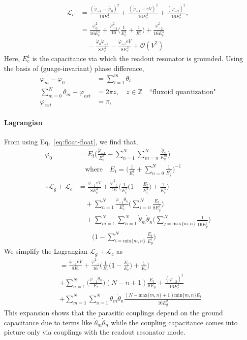 \documentclass[%
reprint,
superscriptaddress,
 amsmath,amssymb,
 aps,
 prx,
longbibliography,
floatfix,
]{revtex4-2}
\begin{document}
\begin{align}
\mathcal{L}_{c}&=\frac{(\dot{\varphi}_{-1}-\dot{\varphi_0})^2}{16E^1_{c}}+\frac{(\dot{\varphi}_{-1}-eV)^2}{16E^3_{c}}+\frac{(\dot{\varphi}_{-2})^2}{16E^4_{c}},\\ &=\frac{\dot{\varphi}^2_0}{16E^1_c}+\frac{\dot{\varphi}^2_{-1}}{16}\Big(\frac{1}{E^1_c}+\frac{1}{E^3_c}\Big)+\frac{\dot{\varphi}^2_{-2}}{16E^4_c}\nonumber\\&\quad-\frac{\dot{\varphi}_0\dot{\varphi}_{-1}}{8E^1_c}-\frac{\dot{\varphi}_{-1}eV}{8E^3_c}+\mathcal{O}(V^2)
\end{align}
Here, $E_c^4$ is the capacitance via which the readout resonator is grounded. Using the basis of (guage-invariant) phase difference, 
\begin{align}
\varphi_m-\varphi_0&=\sum_{l=1}^m\theta_l\\ \sum_{m=0}^N \theta_m+\varphi_{ext}&=2\pi z, \quad z\in\mathbb{Z}\quad\text{``fluxoid quantization"}\\
\varphi_{ext}&=\pi,    
\end{align}
\paragraph{Lagrangian} 
From using Eq.~\ref{eq:float-float}, we find that, 
\begin{align}
    \dot{\varphi}_0&=E_t\Big(\frac{\dot{\varphi}_{-1}}{E_c^1}-\sum_{n=1}^N\sum_{m=n}^N\frac{\dot{\theta}_n}{E^m_g}\Big)\\&\quad\text{where}\quad E_t=\Big(\frac{1}{E_c^1}+\sum_{n=0}^N\frac{1}{E^n_g}\Big)^{-1}\nonumber\\
\therefore     \mathcal{L}_g+\mathcal{L}_c&=\frac{\dot{\varphi}_{-1}eV}{8E^3_c}+\frac{\dot{\varphi}^2_{-1}}{16}\Big(\frac{1}{E^1_c}\Big(1-\frac{E_t}{E_c^1}\Big)+\frac{1}{E^3_c}\Big)\nonumber\\&\quad+\sum_{n=1}^N\frac{\dot{\varphi}_{-1}\dot{\theta}_n}{E_c^1}\Big(\sum_{i=n}^N\frac{E_t}{8E^i_g}\Big)\nonumber\\&\quad+\sum_{m=1}^N\sum_{n=1}^N\dot{\theta}_m\dot{\theta}_{n}\Big( \sum_{j=\text{max}\{m,n\}}^N\frac{1}{16E_g^j}\Big)\nonumber\\&\quad\quad\Big(1-\sum_{i=\text{min}\{m,n\}}^N\frac{E_t}{E_g^i}\Big)
\end{align}
We simplify the Lagrangian $\mathcal{L}_g+\mathcal{L}_c$ as
\begin{align}
    &=\frac{\dot{\varphi}_{-1}eV}{8E_c}+\frac{\dot{\varphi}^2_{-1}}{16}\Big(\frac{1}{E_c}\Big(1-\frac{E_t}{E_c}\Big)+\frac{1}{E_c}\Big)\nonumber\\&+\sum_{n=1}^N\Big(\frac{\dot{\varphi}_{-1}\dot{\theta}_n}{E_c}\Big)(N-n+1)\frac{E_t}{8E_g}+\frac{(\dot{\varphi}_{-2})^2}{16E^4_{c}}\nonumber\\
&+\sum_{m=1}^N\sum_{n=1}^N\dot{\theta}_m\dot{\theta}_{n} \frac{(N-\text{max}\{m,n\}+1)\text{min}\{m,n\}E_t}{16E_g^2}
\end{align}
This expansion shows that the parasitic couplings depend on the ground capacitance due to terms like $\dot{\theta}_m\dot{\theta}_n$ while the coupling capacitance comes into picture only via couplings with the readout resonator mode. 
\end{document}
